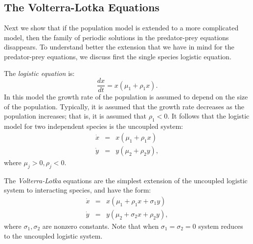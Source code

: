 \subsection*{The Volterra-Lotka Equations}

Next we show that if the population model  is extended to 
a more complicated model, then the family of periodic 
solutions in 
the predator-prey equations disappears.  To understand better the 
extension that we have in mind for the predator-prey equations, we 
discuss first the single species logistic equation.
 
The {\em logistic equation\/}  is:
\[
\frac{dx}{dt} = x(\mu_1 + \rho_1x).
\]
In this model the growth rate of the population is assumed to
depend on the size of the population.  Typically, it is assumed
that the growth rate decreases as the population increases; that
is, it is assumed that $\rho_1 < 0$.  It follows that the
logistic model for two independent species is the uncoupled system:
\begin{eqnarray*}
\dot{x} & = & x(\mu_1 + \rho_1x) \\
\dot{y} & = & y(\mu_2 + \rho_2y),
\end{eqnarray*}
where $\mu_j>0,\rho_j<0$.

The {\em Volterra-Lotka\/} equations 
are the simplest extension
of the uncoupled logistic system to interacting species, and
have the form:
\begin{equation} \label{e:pop2}
\begin{array}{rcl}
\dot{x} & = & x(\mu_1 +   \rho_1x + \sigma_1y) \\
\dot{y} & = & y(\mu_2 + \sigma_2x +   \rho_2y),
\end{array}
\end{equation}
where $\sigma_1,\sigma_2$ are nonzero constants.  Note that when
$\sigma_1=\sigma_2=0$ system  reduces to the
uncoupled logistic system. 

